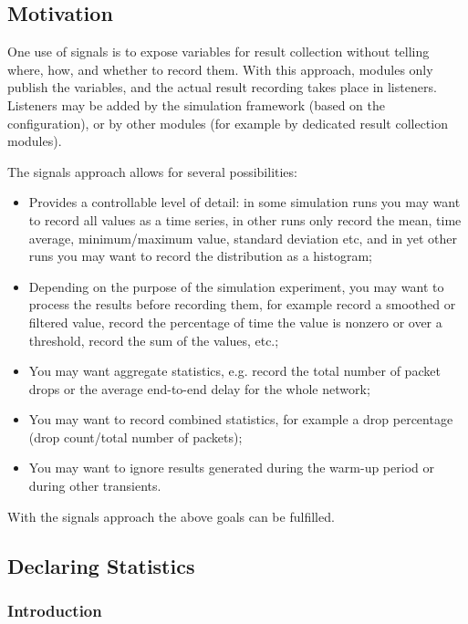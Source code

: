 \subsection{Motivation}
\label{sec:simple-modules:signal-based-statistics-motivation}

One use of signals is to expose variables for result collection without
telling where, how, and whether to record them. With this approach,
modules only publish the variables, and the actual result recording
takes place in listeners. Listeners may be added by the simulation
framework (based on the configuration), or by other modules (for example
by dedicated result collection modules).

The signals approach allows for several possibilities:

\begin{itemize}
 \item Provides a controllable level of detail: in some simulation runs
    you may want to record all values as a time series, in other runs
    only record the mean, time average, minimum/maximum value, standard
    deviation etc, and in yet other runs you may want to record the
    distribution as a histogram;
 \item Depending on the purpose of the simulation experiment, you may want
    to process the results before recording them, for example
    record a smoothed or filtered value, record the percentage of time the
    value is nonzero or over a threshold, record the sum of the values, etc.;
 \item You may want aggregate statistics, e.g. record the total number
    of packet drops or the average end-to-end delay for the whole network;
 \item You may want to record combined statistics, for example a drop
    percentage (drop count/total number of packets);
 \item You may want to ignore results generated during the warm-up period
    or during other transients.
\end{itemize}

With the signals approach the above goals can be fulfilled.


\subsection{Declaring Statistics}
\label{sec:simple-modules:declaring-statistics}

\subsubsection{Introduction}
\label{sec:simple-modules:declared-statistics:introduction}

